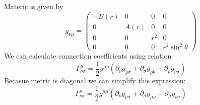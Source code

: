 \problem

Materic is given by
%
\begin{equation}
    g_{\nu\mu} =
    \begin{pmatrix}
        -B(r) & 0    & 0   & 0               \\
        0     & A(r) & 0   & 0               \\
        0     & 0    & r^2 & 0               \\
        0     & 0    & 0   & r^2\sin^2\theta
    \end{pmatrix}
\end{equation}
%
We can calculate connection coefficients using relation
%
\begin{equation}
    \Gamma^\mu_{\nu\sigma} =
    \frac{1}{2} g^{\mu\rho} \left(
    \partial_\nu g_{\rho\sigma} +
    \partial_\sigma g_{\rho\nu} -
    \partial_\rho g_{\nu\sigma}\right)
\end{equation}
%
Becasue metric is diagonal we can simplify this expression:
%
\begin{equation}
    \Gamma^\mu_{\nu\sigma} =
    \frac{1}{2} g^{\mu\mu} \left(
    \partial_\nu g_{\mu\sigma} +
    \partial_\sigma g_{\mu\nu} -
    \partial_\mu g_{\nu\sigma}\right)
\end{equation}
%
